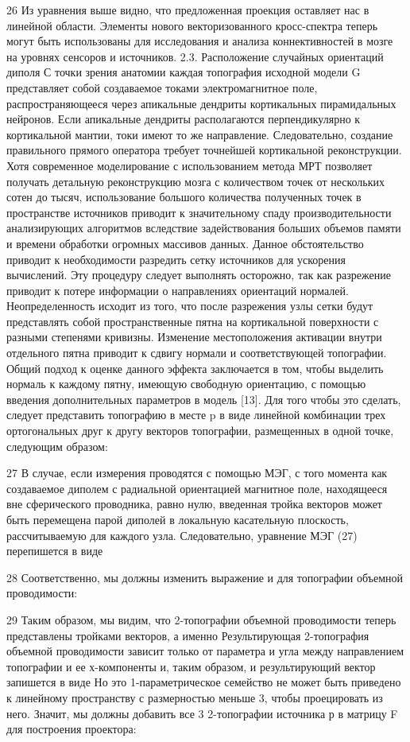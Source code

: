 26
Из уравнения выше видно, что предложенная проекция оставляет нас в линейной области. Элементы нового векторизованного кросс-спектра теперь могут быть использованы для исследования и анализа коннективностей в мозге на уровнях сенсоров и источников.
2.3. Расположение случайных ориентаций диполя
С точки зрения анатомии каждая топография исходной модели G представляет собой создаваемое токами электромагнитное поле, распространяющееся через апикальные дендриты кортикальных пирамидальных нейронов. Если апикальные дендриты располагаются перпендикулярно к кортикальной мантии, токи имеют то же направление. Следовательно, создание правильного прямого оператора требует точнейшей кортикальной реконструкции. Хотя современное моделирование с использованием метода МРТ позволяет получать детальную реконструкцию мозга с количеством точек от нескольких сотен до тысяч, использование большого количества полученных точек в пространстве источников приводит к значительному спаду производительности анализирующих алгоритмов вследствие задействования больших объемов памяти и времени обработки огромных массивов данных.  
Данное обстоятельство приводит к необходимости разредить сетку источников для ускорения вычислений. Эту процедуру следует выполнять осторожно, так как разрежение приводит к потере информации о направлениях ориентаций нормалей. Неопределенность исходит из того, что после разрежения узлы сетки будут представлять собой пространственные пятна на кортикальной поверхности с разными степенями кривизны. Изменение местоположения активации внутри отдельного пятна приводит к сдвигу нормали и соответствующей топографии. Общий подход к оценке данного эффекта заключается в том, чтобы выделить нормаль к каждому пятну, имеющую свободную ориентацию, с помощью введения дополнительных параметров в модель [13].
Для того чтобы это сделать, следует представить топографию в месте p в виде линейной комбинации трех ортогональных друг к другу векторов топографии, размещенных в одной точке, следующим образом:

27
В случае, если измерения проводятся с помощью МЭГ, с того момента как создаваемое диполем с радиальной ориентацией магнитное поле, находящееся вне сферического проводника, равно нулю, введенная тройка векторов может быть перемещена парой диполей в локальную касательную плоскость, рассчитываемую для каждого узла. Следовательно, уравнение МЭГ (27) перепишется в виде

28
Соответственно, мы должны изменить выражение и для топографии объемной проводимости:

29
Таким образом, мы видим, что 2-топографии объемной проводимости теперь представлены тройками векторов, а именно Результирующая 2-топография объемной проводимости зависит только от параметра  и угла между направлением топографии и ее х-компоненты и, таким образом, и результирующий вектор запишется в виде
Но это 1-параметрическое семейство не может быть приведено к линейному пространству с размерностью меньше 3, чтобы проецировать из него. Значит, мы должны добавить все 3 2-топографии источника р в матрицу F для построения проектора:

